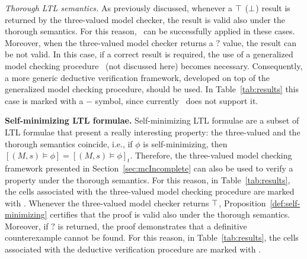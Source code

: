 \emph{Thorough LTL semantics.} As previously discussed, whenever a $\operatorname{\top}$ ($\operatorname{\bot}$) result is returned by the three-valued model checker, the result is valid also under the thorough semantics.
For this reason, \NAME\ can be successfully applied in these cases.
Moreover, when the three-valued model checker returns a $?$ value, the result can be not valid. 
In this case, if a correct result is required, the use of a generalized model checking procedure~\cite{bruns2000model} (not discussed here) becomes necessary. 
Consequently, a more generic deductive verification framework, developed on top of the generalized model checking procedure, should be used.
In Table~\ref{tab:results} this case is marked with a $\boldsymbol{-}$ symbol, since currently \NAME\ does not support it.


\textbf{Self-minimizing LTL formulae.} 
Self-minimizing LTL formulae are a subset of LTL formulae that present a really interesting property: the three-valued and the thorough semantics coincide, i.e., if $\phi$ is self-minimizing, then $[(M, s) \models \phi]=[(M, s) \models \phi]_t$.
Therefore, the three-valued model checking framework presented in Section~\ref{sec:mcIncomplete} can also be used to verify a property under the thorough semantics. 
For this reason, in Table~\ref{tab:results}, the cells associated with the three-valued model checking procedure are marked with \validCounterexample.
Whenever the three-valued model checker returns $\operatorname{\top}$, Proposition~\ref{def:self-minimizing} certifies that the proof is valid also under the thorough semantics. 
Moreover, if $?$ is returned, the proof demonstrates that a definitive counterexample cannot be found.
For this reason, in Table~\ref{tab:results}, the cells associated with the deductive verification procedure are marked with \validProof.

%





